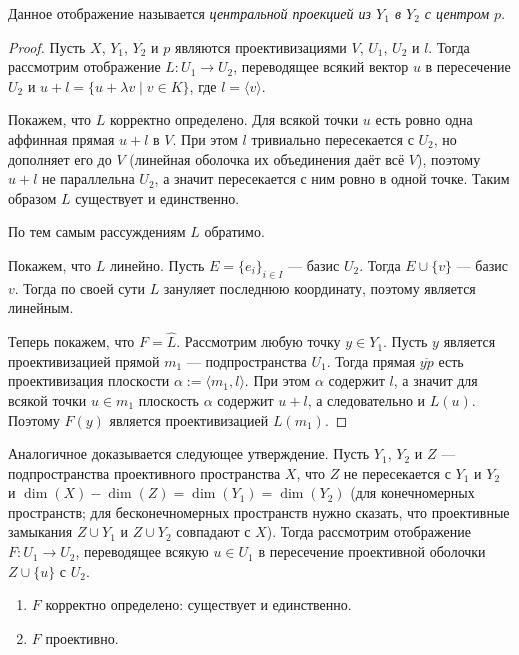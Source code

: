 \documentclass[12pt,a4paper]{article}
\begin{document}
    \begin{definition}
        Данное отображение называется \emph{центральной проекцией из $Y_1$ в $Y_2$ с центром $p$}.
    \end{definition}

    \begin{proof}
        Пусть $X$, $Y_1$, $Y_2$ и $p$ являются проективизациями $V$, $U_1$, $U_2$ и $l$. Тогда рассмотрим отображение $L: U_1 \to U_2$, переводящее всякий вектор $u$ в пересечение $U_2$ и $u + l = \{u + \lambda v \mid v \in K\}$, где $l = \langle v \rangle$.

        Покажем, что $L$ корректно определено. Для всякой точки $u$ есть ровно одна аффинная прямая $u + l$ в $V$. При этом $l$ тривиально пересекается с $U_2$, но дополняет его до $V$ (линейная оболочка их объединения даёт всё $V$), поэтому $u + l$ не параллельна $U_2$, а значит пересекается с ним ровно в одной точке. Таким образом $L$ существует и единственно.

        По тем самым рассуждениям $L$ обратимо.

        Покажем, что $L$ линейно. Пусть $E = \{e_i\}_{i \in I}$ --- базис $U_2$. Тогда $E \cup \{v\}$ --- базис $v$. Тогда по своей сути $L$ зануляет последнюю координату, поэтому является линейным.

        Теперь покажем, что $F = \widehat{L}$. Рассмотрим любую точку $y \in Y_1$. Пусть $y$ является проективизацией прямой $m_1$ --- подпространства $U_1$. Тогда прямая $\overline{yp}$ есть проективизация плоскости $\alpha := \langle m_1, l\rangle$. При этом $\alpha$ содержит $l$, а значит для всякой точки $u \in m_1$ плоскость $\alpha$ содержит $u + l$, а следовательно и $L(u)$. Поэтому $F(y)$ является проективизацией $L(m_1)$.
    \end{proof}

    \begin{remark}\label{sympathetic-proj-basis-representation}
        Аналогичное доказывается следующее утверждение. Пусть $Y_1$, $Y_2$ и $Z$ --- подпространства проективного пространства $X$, что $Z$ не пересекается с $Y_1$ и $Y_2$ и $\dim(X) - \dim(Z) = \dim(Y_1) = \dim(Y_2)$ (для конечномерных пространств; для бесконечномерных пространств нужно сказать, что проективные замыкания $Z \cup Y_1$ и $Z \cup Y_2$ совпадают с $X$). Тогда рассмотрим отображение $F: U_1 \to U_2$, переводящее всякую $u \in U_1$ в пересечение проективной оболочки $Z \cup \{u\}$ с $U_2$.
        \begin{enumerate}
            \item $F$ корректно определено: существует и единственно.
            \item $F$ проективно.
        \end{enumerate}
    \end{remark}
\end{document}
